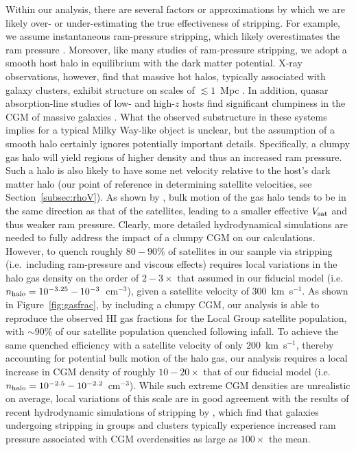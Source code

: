 Within our analysis, there are several factors or approximations by
which we are likely over- or under-estimating the true effectiveness
of stripping.
%
For example, we assume instantaneous ram-pressure stripping, which
likely overestimates the ram pressure \citep{tonnesen16}.
%
Moreover, like many studies of ram-pressure stripping, we adopt a
smooth host halo in equilibrium with the dark matter potential. X-ray
observations, however, find that massive hot halos, typically
associated with galaxy clusters, exhibit structure on scales of $\lesssim
1$~Mpc \citep{buote96, schuecker01}.
%
In addition, quasar absorption-line studies of low- and high-$z$ hosts
find significant clumpiness in the CGM of massive galaxies
\citep[e.g.][]{thom12, ab15}.
%
What the observed substructure in these systems implies for a typical
Milky Way-like object is unclear, but the assumption of a smooth halo
certainly ignores potentially important details.
%
Specifically, a clumpy gas halo will yield regions of higher density
and thus an increased ram pressure. Such a halo is also likely to have
some net velocity relative to the host's dark matter halo (our point
of reference in determining satellite velocities, see
Section~\ref{subsec:rhoV}). As shown by \citet{tonnesen08}, bulk
motion of the gas halo tends to be in the same direction as that of
the satellites, leading to a smaller effective $V_{\rm sat}$ and thus
weaker ram pressure.
Clearly, more detailed hydrodynamical simulations are needed to fully
address the impact of a clumpy CGM on our calculations.
%
However, to quench roughly $80-90\%$ of satellites in our sample via
stripping (i.e.~including ram-pressure and viscous effects) requires
local variations in the halo gas density on the order of $2-3\times$
that assumed in our fiducial model (i.e.~$n_{\rm halo} =
10^{-3.25}-10^{-3}$~cm$^{-3}$), given a satellite velocity of
$300$~km~s$^{-1}$. 
%
As shown in Figure~\ref{fig:gasfrac}, by including a clumpy CGM, our
analysis is able to reproduce the observed H{\scriptsize I} gas
fractions for the Local Group satellite population, with $\sim90\%$ of
our satellite population quenched following infall.
%
To achieve the same quenched efficiency with a satellite velocity of
only $200$~km~s$^{-1}$, thereby accounting for potential bulk motion
of the halo gas, our analysis requires a local increase in CGM density
of roughly $10-20\times$ that of our fiducial model (i.e.~$n_{\rm
  halo} = 10^{-2.5}-10^{-2.2}$~cm$^{-3}$).
%
While such extreme CGM densities are unrealistic on average, local
variations of this scale are in good agreement with the results of
recent hydrodynamic simulations of stripping by \citet{bahe15}, which
find that galaxies undergoing stripping in groups and clusters
typically experience increased ram pressure associated with CGM
overdensities as large as $100\times$ the mean.
%


